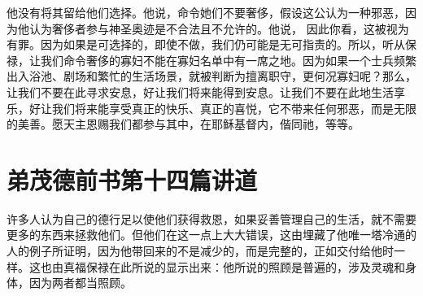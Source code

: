 他没有将其留给他们选择。他说，命令她们不要奢侈，假设这公认为一种邪恶，因为他认为奢侈者参与神圣奥迹是不合法且不允许的。他说， 因此你看，这被视为有罪。因为如果是可选择的，即使不做，我们仍可能是无可指责的。所以，听从保禄，让我们命令奢侈的寡妇不能在寡妇名单中有一席之地。因为如果一个士兵频繁出入浴池、剧场和繁忙的生活场景，就被判断为擅离职守，更何况寡妇呢？那么，让我们不要在此寻求安息，好让我们将来能得到安息。让我们不要在此地生活享乐，好让我们将来能享受真正的快乐、真正的喜悦，它不带来任何邪恶，而是无限的美善。愿天主恩赐我们都参与其中，在耶稣基督内，偕同祂，等等。\par



\section{弟茂德前书第十四篇讲道}

\par

\par

许多人认为自己的德行足以使他们获得救恩，如果妥善管理自己的生活，就不需要更多的东西来拯救他们。但他们在这一点上大大错误，这由埋藏了他唯一塔冷通的人的例子所证明，因为他带回来的不是减少的，而是完整的，正如交付给他时一样。这也由真福保禄在此所说的显示出来：他所说的照顾是普遍的，涉及灵魂和身体，因为两者都当照顾。\par

